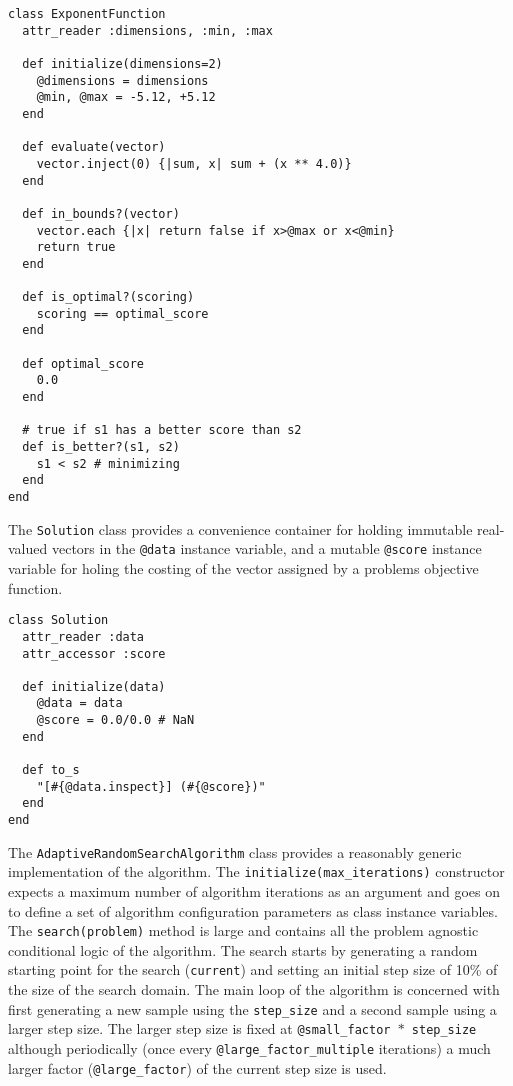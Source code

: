 \begin{lstlisting}
class ExponentFunction
  attr_reader :dimensions, :min, :max

  def initialize(dimensions=2)
    @dimensions = dimensions
    @min, @max = -5.12, +5.12
  end

  def evaluate(vector)
    vector.inject(0) {|sum, x| sum + (x ** 4.0)}
  end  
  
  def in_bounds?(vector)
    vector.each {|x| return false if x>@max or x<@min}
    return true    
  end

  def is_optimal?(scoring)
    scoring == optimal_score
  end

  def optimal_score
    0.0
  end
  
  # true if s1 has a better score than s2
  def is_better?(s1, s2)
    s1 < s2 # minimizing
  end
end
\end{lstlisting}

The \texttt{Solution} class provides a convenience container for holding immutable real-valued vectors in the \texttt{@data} instance variable, and a mutable \texttt{@score} instance variable for holing the costing of the vector assigned by a problems objective function. 

\begin{lstlisting}
class Solution
  attr_reader :data
  attr_accessor :score
  
  def initialize(data)
    @data = data
    @score = 0.0/0.0 # NaN
  end
  
  def to_s
    "[#{@data.inspect}] (#{@score})"
  end    
end
\end{lstlisting}

The \texttt{AdaptiveRandomSearchAlgorithm} class provides a reasonably generic implementation of the algorithm. The \texttt{initialize(max\_iterations)} constructor expects a maximum number of algorithm iterations as an argument and goes on to define a set of algorithm configuration parameters as class instance variables. The \texttt{search(problem)} method is large and contains all the problem agnostic conditional logic of the algorithm. The search starts by generating a random starting point for the search (\texttt{current}) and setting an initial step size of 10\% of the size of the search domain. The main loop of the algorithm is concerned with first generating a new sample using the \texttt{step\_size} and a second sample using a larger step size. The larger step size is fixed at \texttt{@small\_factor $*$ step\_size} although periodically (once every \texttt{@large\_factor\_multiple} iterations) a much larger factor (\texttt{@large\_factor}) of the current step size is used.

